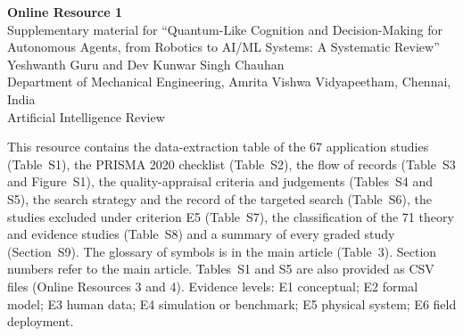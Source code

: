 \documentclass[10pt,a4paper]{article}
\begin{document}
\begin{center}
{\Large\bfseries Online Resource 1}\\[4pt]
{\large Supplementary material for ``Quantum-Like Cognition and Decision-Making for Autonomous Agents, from Robotics to AI/ML Systems: A Systematic Review''}\\[4pt]
Yeshwanth Guru and Dev Kunwar Singh Chauhan\\
Department of Mechanical Engineering, Amrita Vishwa Vidyapeetham, Chennai, India\\
Artificial Intelligence Review
\end{center}

\noindent This resource contains the data-extraction table of the 67 application studies (Table~S1), the PRISMA 2020 checklist (Table~S2), the flow of records (Table~S3 and Figure~S1), the quality-appraisal criteria and judgements (Tables~S4 and S5), the search strategy and the record of the targeted search (Table~S6), the studies excluded under criterion E5 (Table~S7), the classification of the 71 theory and evidence studies (Table~S8) and a summary of every graded study (Section~S9). The glossary of symbols is in the main article (Table~3). Section numbers refer to the main article. Tables~S1 and S5 are also provided as CSV files (Online Resources 3 and 4). Evidence levels: E1 conceptual; E2 formal model; E3 human data; E4 simulation or benchmark; E5 physical system; E6 field deployment.
\end{document}
